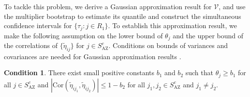\documentclass[12pt]{article}
\def\AZ{{ \mathrm{\scriptscriptstyle AZ} }}
\theoremstyle{definition}
\newtheorem{as}{Condition}
\newcommand{\V}{\rm Var}
\newcommand{\bS}{{\mathbf S}}
\begin{document}
To tackle this problem, we derive a Gaussian approximation result for $\mathcal{V}$, and use the multiplier bootstrap to estimate its quantile and construct the simultaneous confidence intervals for $\{\tau_j: j \in R_1\}$.
To establish this approximation result, we make the following assumption on the lower bound of $\theta_j$ and the upper bound of the correlations of $\{\tilde{\eta}_{ij}\}$ for $j \in S_{\AZ}^{c}$.
Conditions on bounds of variances and covariances are needed for Gaussian approximation results \citep{chernozhukov2013gaussian}. 

\begin{as}\label{as:rho}
There exist small positive constants $b_1$ and $b_2$ 
such that 
$\theta_j \geq b_1$ for all $j \in S_{\AZ}^{c}$ and $|\mbox{Cor}(\tilde{\eta}_{i j_1}, \tilde{\eta}_{i j_2})| \leq 1 - b_2$ for all $j_1, j_2 \in S_{\AZ}^{c}$ and $j_1 \neq j_2$.
\end{as}

\end{document}
